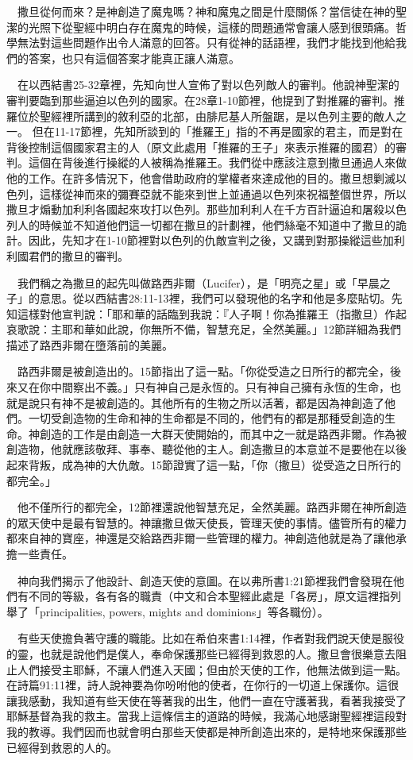 \documentclass{book}
\begin{document}
　撒旦從何而來？是神創造了魔鬼嗎？神和魔鬼之間是什麼關係？當信徒在神的聖潔的光照下從聖經中明白存在魔鬼的時候，這樣的問題通常會讓人感到很頭痛。哲學無法對這些問題作出令人滿意的回答。只有從神的話語裡，我們才能找到他給我們的答案，也只有這個答案才能真正讓人滿意。

　在以西結書25-32章裡，先知向世人宣佈了對以色列敵人的審判。他說神聖潔的審判要臨到那些逼迫以色列的國家。在28章1-10節裡，他提到了對推羅的審判。推羅位於聖經裡所講到的敘利亞的北部，由腓尼基人所盤踞，是以色列主要的敵人之一。 但在11-17節裡，先知所談到的「推羅王」指的不再是國家的君主，而是對在背後控制這個國家君主的人（原文此處用「推羅的王子」來表示推羅的國君）的審判。這個在背後進行操縱的人被稱為推羅王。我們從中應該注意到撒旦通過人來做他的工作。在許多情況下，他會借助政府的掌權者來達成他的目的。撒旦想剿滅以色列，這樣從神而來的彌賽亞就不能來到世上並通過以色列來祝福整個世界，所以撒旦才煽動加利利各國起來攻打以色列。那些加利利人在千方百計逼迫和屠殺以色列人的時候並不知道他們這一切都在撒旦的計劃裡，他們絲毫不知道中了撒旦的詭計。因此，先知才在1-10節裡對以色列的仇敵宣判之後，又講到對那操縱這些加利利國君們的撒旦的審判。

　我們稱之為撒旦的起先叫做路西非爾（Lucifer），是「明亮之星」或「早晨之子」的意思。從以西結書28:11-13裡，我們可以發現他的名字和他是多麼貼切。先知這樣對他宣判說：「耶和華的話臨到我說：『人子啊！你為推羅王（指撒旦）作起哀歌說：主耶和華如此說，你無所不備，智慧充足，全然美麗。」12節詳細為我們描述了路西非爾在墮落前的美麗。

　路西非爾是被創造出的。15節指出了這一點。「你從受造之日所行的都完全，後來又在你中間察出不義。」只有神自己是永恆的。只有神自己擁有永恆的生命，也就是說只有神不是被創造的。其他所有的生物之所以活著，都是因為神創造了他們。一切受創造物的生命和神的生命都是不同的，他們有的都是那種受創造的生命。神創造的工作是由創造一大群天使開始的，而其中之一就是路西非爾。作為被創造物，他就應該敬拜、事奉、聽從他的主人。創造撒旦的本意並不是要他在以後起來背叛，成為神的大仇敵。15節證實了這一點，「你（撒旦）從受造之日所行的都完全。」

　他不僅所行的都完全，12節裡還說他智慧充足，全然美麗。路西非爾在神所創造的眾天使中是最有智慧的。神讓撒旦做天使長，管理天使的事情。儘管所有的權力都來自神的寶座，神還是交給路西非爾一些管理的權力。神創造他就是為了讓他承擔一些責任。

　神向我們揭示了他設計、創造天使的意圖。在以弗所書1:21節裡我們會發現在他們有不同的等級，各有各的職責（中文和合本聖經此處是「各房」，原文這裡指列舉了「principalities, powers, mights and dominions」等各職份）。

　有些天使擔負著守護的職能。比如在希伯來書1:14裡，作者對我們說天使是服役的靈，也就是說他們是僕人，奉命保護那些已經得到救恩的人。撒旦會很樂意去阻止人們接受主耶穌，不讓人們進入天國；但由於天使的工作，他無法做到這一點。在詩篇91:11裡，詩人說神要為你吩咐他的使者，在你行的一切道上保護你。這很讓我感動，我知道有些天使在等著我的出生，他們一直在守護著我，看著我接受了耶穌基督為我的救主。當我上這條信主的道路的時候，我滿心地感謝聖經裡這段對我的教導。我們因而也就會明白那些天使都是神所創造出來的，是特地來保護那些已經得到救恩的人的。
\end{document}
